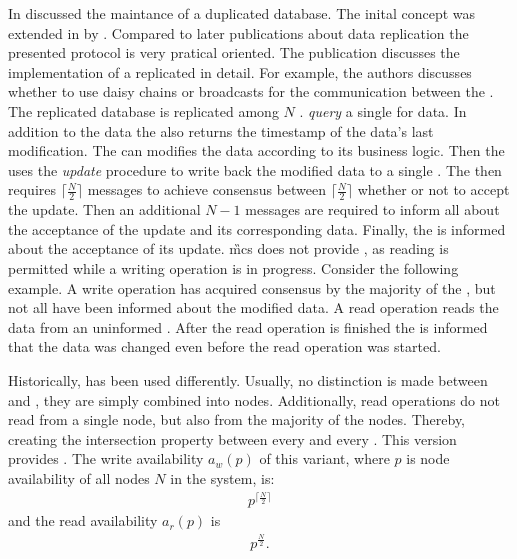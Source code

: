 \documentclass[conference]{IEEEtran}
\begin{document}
In \cite{Johnson:1975:MDD:RFC0677} \citeauthor{Johnson:1975:MDD:RFC0677}
discussed the maintance of a duplicated database.
The inital concept was extended in  by
\citeauthor{Tho79:mca}.
Compared to later publications about data replication the presented protocol
is very pratical oriented.
The publication discusses the implementation of a replicated  in
detail.
For example, the authors discusses whether to use daisy chains or broadcasts
for the communication between the .
The replicated database is replicated among \(N\) .
 \emph{query} a single  for data.
In addition to the data the  also returns the timestamp of the data's
last modification.
The  can modifies the data according to its business logic.
Then the  uses the \emph{update} procedure to write back the modified
data to a single .
The  then requires \(\lceil \frac{N}{2} \rceil\) messages to achieve
consensus between \(\lceil \frac{N}{2 }\rceil\)  whether or not to
accept the update.
Then an additional \(N-1\) messages are required to inform all  about
the acceptance of the update and its corresponding data.
Finally, the  is informed about the acceptance of its update.
\G{mcs} does not provide , as reading is permitted while a writing
operation is in progress.
Consider the following example.
A write operation has acquired consensus by the majority of the , but
not all  have been informed about the modified data.
A read operation reads the data from an uninformed .
After the read operation is finished the  is informed that the data
was changed even before the read operation was started.

Historically,  has been used differently.
Usually, no distinction is made between  and , they are simply
combined into nodes.
Additionally, read operations do not read from a single node, but also from
the majority of the nodes.
Thereby, creating the intersection property between every  and every
.
This version provides .
The write availability \(a_w(p)\) of this variant, where \(p\) is node
availability of all nodes \(N\) in the system, is:
\begin{align}
	p^{\lceil \frac{N}{2} \rceil}
\end{align}
and the read availability \(a_r(p)\) is
\begin{align}
	p^{\frac{N}{2}}.
\end{align}
\end{document}

